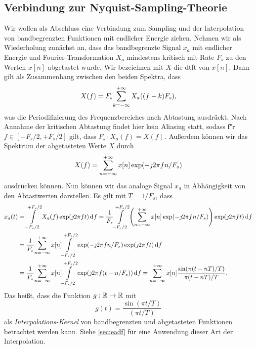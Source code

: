 \subsection{Verbindung zur Nyquist-Sampling-Theorie}
%
%
Wir wollen als Abschluss eine Verbindung zum Sampling und der Interpolation~\cite[Kapitel~6.1]{proakis2013} von bandbegrenzten Funktionen mit endlicher Energie ziehen. Nehmen wir als Wiederholung zun\"achst an, dass das bandbegrenzte Signal $x_a$ mit endlicher Energie und Fourier-Transformation $X_a$ mindestens kritisch mit Rate $F_s$ zu den Werten $x[n]$ abgetastet wurde. Wir bezeichnen mit $X$ die \gls{dtft} von $x[n]$. Dann gilt als Zusammenhang zwischen den beiden Spektra, dass
\begin{equation}
    X(f) = F_s {\sum\limits_{k=-\infty}^{+\infty}{
        X_a((f - k) F_s)
    }} ,
\end{equation}
was die Periodifizierung des Frequenzbereiches nach Abtastung ausdr\"uckt. Nach Annahme der kritischen Abtastung findet hier kein Aliasing statt, sodass f\u"r $f \in [-F_s/2,+F_s/2]$ gilt, dass $F_s \cdot X_a(f) = X(f)$. Au{\ss}erdem k\"onnen wir das Spektrum der abgetasteten Werte $X$ durch
\begin{equation}
    X(f) = {\sum\limits_{n=-\infty}^{+\infty}{x[n] \exp(- \jmath 2 \pi f n / F_s)}}
\end{equation}
ausdr\"ucken k\"onnen. Nun k\"onnen wir das analoge Signal $x_a$ in Abh\"angigkeit von den Abtastwerten darstellen. Es gilt mit $T = 1/F_s$, dass
\begin{align*}
    x_a(t) &= {\int\limits_{-F_s/2}^{+F_s/2}{
        X_a(f) \exp(\jmath 2 \pi f t)
    }\,\mathrm{d}{f}} = \frac{1}{F_s} {\int\limits_{-F_s/2}^{+F_s/2}{
        \left(
            {\sum\limits_{n=-\infty}^{+\infty}{x[n] \exp(- \jmath 2 \pi f n / F_s)}}
        \right) \exp(\jmath 2 \pi f t)
    }\,\mathrm{d}{f}} \\
    &= \frac{1}{F_s} 
        {\sum\limits_{n=-\infty}^{+\infty}{
            x[n] {\int\limits_{-F_s/2}^{+F_s/2}{\exp(- \jmath 2 \pi f n / F_s) \exp(\jmath 2 \pi f t)}\,\mathrm{d}{f}}
        }} \\
    &= \frac{1}{F_s} 
    {\sum\limits_{n=-\infty}^{+\infty}{
        x[n] {\int\limits_{-F_s/2}^{+F_s/2}{\exp(\jmath 2 \pi f (t - n/F_s))}\,\mathrm{d}{f}}
    }} 
    = {\sum\limits_{n=-\infty}^{+\infty}{
        x[n] \frac{\sin(\pi(t-nT)/T)}{\pi(t-nT)/T}
    }}.
\end{align*}
Das hei{\ss}t, dass die Funktion $g: \mathbb{R} \rightarrow \mathbb{R}$ mit
\begin{equation}\label{bsplines_sinckernel}
    g(t) = \frac{\sin(\pi t / T)}{(\pi t/T)}
\end{equation}
als \emph{Interpolations-Kernel} von bandbegrenzten und abgetasteten Funktionen betrachtet werden kann. Siehe \cref{sec:eadf} f\"ur eine Anwendung dieser Art der Interpolation.

